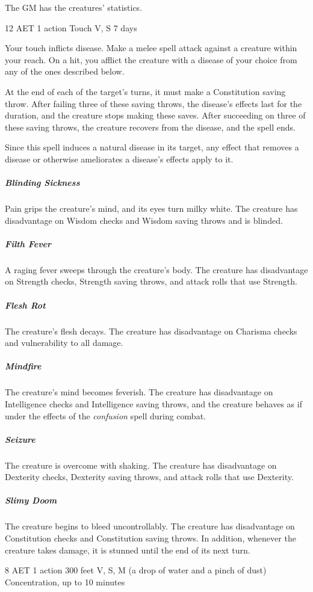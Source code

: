 The GM has the creatures' statistics.


{12 AET}
{1 action}
{Touch}
{V, S}
{7 days}

Your touch inflicts disease. Make a melee spell attack against a creature within your reach. On a hit, you afflict the creature with a disease of your choice from any of the ones described below.

At the end of each of the target's turns, it must make a Constitution saving throw. After failing three of these saving throws, the disease's effects last for the duration, and the creature stops making these saves. After succeeding on three of these saving throws, the creature recovers from the disease, and the spell ends.

Since this spell induces a natural disease in its target, any effect that removes a disease or otherwise ameliorates a disease's effects apply to it.

\subparagraph*{Blinding Sickness} Pain grips the creature's mind, and its eyes turn milky white. The creature has disadvantage on Wisdom checks and Wisdom saving throws and is blinded.

\subparagraph*{Filth Fever} A raging fever sweeps through the creature's body. The creature has disadvantage on Strength checks, Strength saving throws, and attack rolls that use Strength.

\subparagraph*{Flesh Rot} The creature's flesh decays. The creature has disadvantage on Charisma checks and vulnerability to all damage.

\subparagraph*{Mindfire} The creature's mind becomes feverish. The creature has disadvantage on Intelligence checks and Intelligence saving throws, and the creature behaves as if under the effects of the \textit{confusion} spell during combat.

\subparagraph*{Seizure} The creature is overcome with shaking. The creature has disadvantage on Dexterity checks, Dexterity saving throws, and attack rolls that use Dexterity.

\subparagraph*{Slimy Doom} The creature begins to bleed uncontrollably. The creature has disadvantage on Constitution checks and Constitution saving throws. In addition, whenever the creature takes damage, it is stunned until the end of its next turn.


{8 AET}
{1 action}
{300 feet}
{V, S, M (a drop of water and a pinch of dust)}
{Concentration, up to 10 minutes}


